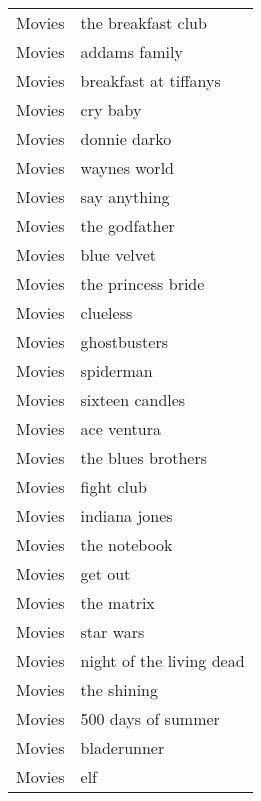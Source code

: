 \begin{supertabular}{l p{0.25\textwidth}}
           Movies &                 the breakfast club \\
           Movies &                      addams family \\
           Movies &              breakfast at tiffanys \\
           Movies &                           cry baby \\
           Movies &                       donnie darko \\
           Movies &                       waynes world \\
           Movies &                       say anything \\
           Movies &                      the godfather \\
           Movies &                        blue velvet \\
           Movies &                 the princess bride \\
           Movies &                           clueless \\
           Movies &                       ghostbusters \\
           Movies &                          spiderman \\
           Movies &                    sixteen candles \\
           Movies &                        ace ventura \\
           Movies &                 the blues brothers \\
           Movies &                         fight club \\
           Movies &                      indiana jones \\
           Movies &                       the notebook \\
           Movies &                            get out \\
           Movies &                         the matrix \\
           Movies &                          star wars \\
           Movies &           night of the living dead \\
           Movies &                        the shining \\
           Movies &                 500 days of summer \\
           Movies &                        bladerunner \\
           Movies &                                elf \\

\end{supertabular}
